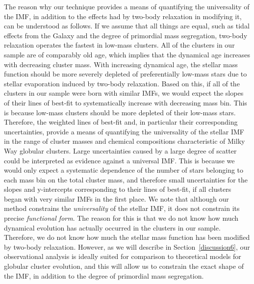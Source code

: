 
The reason why our technique provides a means of quantifying the
universality of the IMF, in addition to the effects had by 
two-body relaxation in modifying it, can be
understood as follows.  If we assume that all things are equal, such
as tidal effects from the Galaxy and the degree of primordial mass
segregation, two-body 
relaxation operates the fastest in low-mass clusters.  All of the
clusters in our sample are of comparably old age, which implies that the
dynamical age increases with decreasing cluster mass.  With increasing
dynamical age, the stellar mass function should be more severely
depleted of preferentially low-mass stars due to stellar evaporation
induced by two-body relaxation.  Based on this,
if all of the clusters in our sample were born with similar IMFs, we
would expect the slopes of their lines of best-fit to systematically
increase with decreasing 
mass bin.  This is because low-mass clusters should be more depleted
of their low-mass stars.  %
Therefore, the weighted lines of best-fit and, in particular their
corresponding uncertainties, provide a means of quantifying
the universality of the stellar IMF in the range of cluster masses and
chemical compositions characteristic of Milky Way globular clusters.
Large uncertainties caused by a large degree of scatter could be
interpreted as evidence against a universal IMF.  This is because we
would only expect a systematic dependence of the number of stars
belonging to each mass bin on the total cluster mass, and
therefore small uncertainties for the slopes and y-intercepts
corresponding to their lines of best-fit, if all clusters
began with very similar IMFs in the first place.  We note that
although our method constrains the \textit{universality} of the
stellar IMF, it does not constrain its precise \textit{functional
  form}.  The reason for this is that we do not know how much dynamical
evolution has actually occurred in the clusters in our sample.
Therefore, we do not know how much the stellar mass function has been
modified by two-body relaxation.  However, as we will describe in
Section~\ref{discussion6}, our observational analysis is ideally suited
for comparison to theoretical models for globular cluster evolution,
and this will allow us to constrain the exact shape of the IMF, in
addition to the degree of primordial mass segregation.

